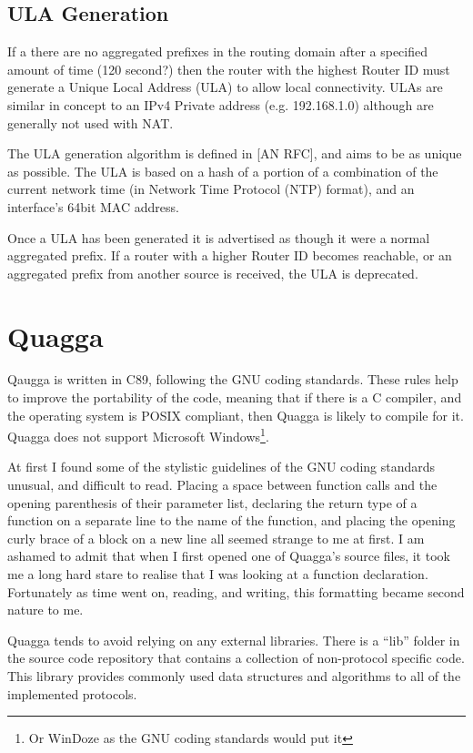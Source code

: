 \documentclass[12pt]{report}
\begin{document}
\subsection{ULA Generation}
If a there are no aggregated prefixes in the routing domain after a specified
amount of time (120 second?) then the router with the highest Router ID must
generate a Unique Local Address (ULA) 
to allow local connectivity. ULAs are similar in concept to an IPv4 Private
address (e.g. 192.168.1.0) although are generally not used with NAT\@. 

The ULA generation algorithm is defined in [AN RFC], and aims to be as unique
as possible. The ULA is based on a hash of a portion of a combination of the 
current network time (in Network Time Protocol (NTP)  format), and an interface's 64bit MAC address. 

Once a ULA has been generated it is advertised as though it were a normal
aggregated prefix. If a router with a higher Router ID becomes reachable, or an
aggregated prefix from another source is received, the ULA is deprecated. 

\section{Quagga}
Qaugga is written in C89, following the GNU coding standards. These rules help
to improve the portability of the code, meaning that if there is a C compiler,
and the operating system is POSIX compliant, then Quagga is likely to compile
for it.  Quagga does not support Microsoft Windows\footnote{Or WinDoze as the GNU coding
standards would put it}.

At first I found some of the stylistic guidelines of the GNU coding standards
unusual, and difficult to read. Placing a space between function calls and the
opening parenthesis of their parameter list, declaring the return type of a
function on a separate line to the name of the function, and placing the
opening curly brace of a block on a new line all seemed strange to me at first.
I am ashamed to admit that when I first opened one of Quagga's source files, it
took me a long hard stare to realise that I was looking at a function
declaration. Fortunately as time went on, reading, and writing, this formatting
became second nature to me. 

Quagga tends to avoid relying on any external libraries. There is a ``lib''
folder in the source code repository that contains a collection of non-protocol 
specific code. This library provides commonly used data structures and 
algorithms to all of the implemented protocols. 
\end{document}
